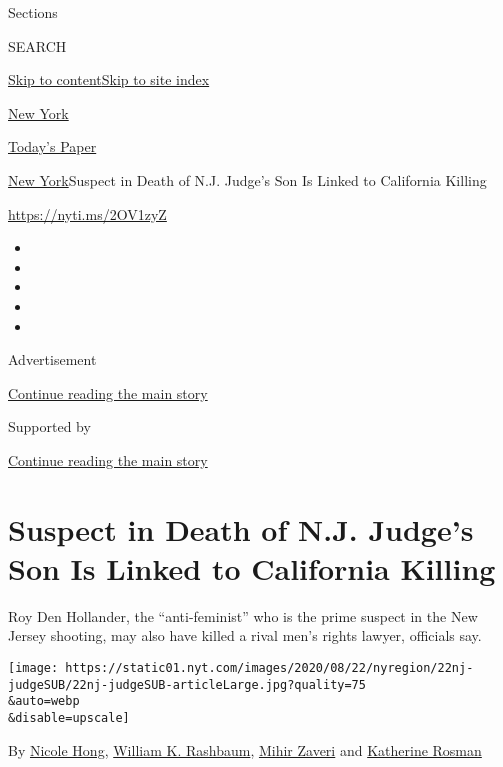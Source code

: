 Sections

SEARCH

\protect\hyperlink{site-content}{Skip to
content}\protect\hyperlink{site-index}{Skip to site index}

\href{https://www.nytimes.com/section/nyregion}{New York}

\href{https://myaccount.nytimes.com/auth/login?response_type=cookie\&client_id=vi}{}

\href{https://www.nytimes.com/section/todayspaper}{Today's Paper}

\href{/section/nyregion}{New York}\textbar{}Suspect in Death of N.J.
Judge's Son Is Linked to California Killing

\url{https://nyti.ms/2OV1zyZ}

\begin{itemize}
\item
\item
\item
\item
\item
\end{itemize}

Advertisement

\protect\hyperlink{after-top}{Continue reading the main story}

Supported by

\protect\hyperlink{after-sponsor}{Continue reading the main story}

\hypertarget{suspect-in-death-of-nj-judges-son-is-linked-to-california-killing}{%
\section{Suspect in Death of N.J. Judge's Son Is Linked to California
Killing}\label{suspect-in-death-of-nj-judges-son-is-linked-to-california-killing}}

Roy Den Hollander, the ``anti-feminist'' who is the prime suspect in the
New Jersey shooting, may also have killed a rival men's rights lawyer,
officials say.

\texttt{[image: https://static01.nyt.com/images/2020/08/22/nyregion/22nj-judgeSUB/22nj-judgeSUB-articleLarge.jpg?quality=75\\\&auto=webp\\\&disable=upscale]}

By \href{https://www.nytimes.com/by/nicole-hong}{Nicole Hong},
\href{https://www.nytimes.com/by/william-k-rashbaum}{William K.
Rashbaum}, \href{https://www.nytimes.com/by/mihir-zaveri}{Mihir Zaveri}
and \href{https://www.nytimes.com/by/katherine-rosman}{Katherine Rosman}

